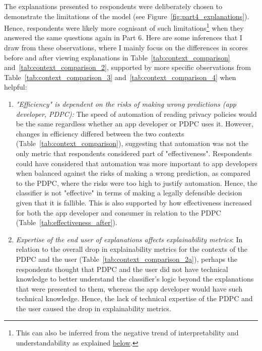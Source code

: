 The explanations presented to respondents were deliberately chosen to demonstrate the limitations of the model (see Figure~\ref{fig:part4_explanations}). Hence, respondents were likely more cognisant of such limitations\footnote{This can also be inferred from the negative trend of interpretability and understandability as explained \hyperref[sec:interpret_understand]{below}.} when they answered the same questions again in Part 6. Here are some inferences that I draw from these observations, where I mainly focus on the differences in scores before and after viewing explanations in Table~\ref{tab:context_comparison} and~\ref{tab:context_comparison_2}, supported by more specific observations from Table~\ref{tab:context_comparison_3} and~\ref{tab:context_comparison_4} when helpful:
\begin{enumerate}[listparindent=0.5cm]
    \item \textit{"Efficiency" is dependent on the risks of making wrong predictions (app developer, PDPC):} The speed of automation of reading privacy policies would be the same regardless whether an app developer or PDPC uses it. However, changes in efficiency differed between the two contexts (Table~\ref{tab:context_comparison}), suggesting that automation was not the only metric that respondents considered part of "effectiveness". Respondents could have considered that automation was more important to app developers when balanced against the risks of making a wrong prediction, as compared to the PDPC, where the risks were too high to justify automation. Hence, the classifier is not "effective" in terms of making a legally defensible decision given that it is fallible. This is also supported by how effectiveness increased for both the app developer and consumer in relation to the PDPC (Table~\ref{tab:effectiveness_after}).
         
    \item \textit{Expertise of the end user of explanations affects explainability metrics}: In relation to the overall drop in explainability metrics for the contexts of the PDPC and the user (Table~\ref{tab:context_comparison_2a}), perhaps the respondents thought that PDPC and the user did not have technical knowledge to better understand the classifier's logic beyond the explanations that were presented to them, whereas the app developer would have such technical knowledge. Hence, the lack of technical expertise of the PDPC and the user caused the drop in explainability metrics.
     

\end{enumerate}
